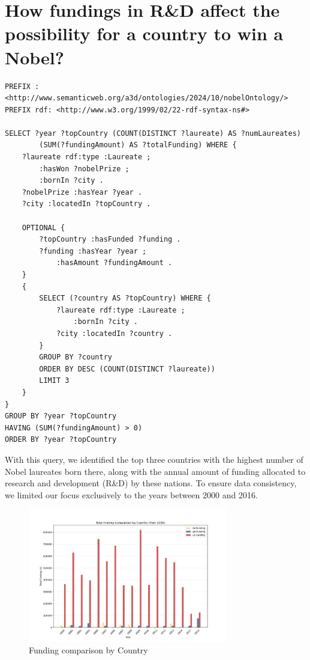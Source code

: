 \documentclass{article}
\begin{document}
\newpage

\section{How fundings in R\&D affect the possibility for a country to win a Nobel?}

\begin{lstlisting}
PREFIX : <http://www.semanticweb.org/a3d/ontologies/2024/10/nobelOntology/>
PREFIX rdf: <http://www.w3.org/1999/02/22-rdf-syntax-ns#>

SELECT ?year ?topCountry (COUNT(DISTINCT ?laureate) AS ?numLaureates)
        (SUM(?fundingAmount) AS ?totalFunding) WHERE {
    ?laureate rdf:type :Laureate ;
  	    :hasWon ?nobelPrize ;
        :bornIn ?city .
    ?nobelPrize :hasYear ?year .
    ?city :locatedIn ?topCountry .

    OPTIONAL {
        ?topCountry :hasFunded ?funding .
        ?funding :hasYear ?year ;
            :hasAmount ?fundingAmount .
    }
    {
        SELECT (?country AS ?topCountry) WHERE {
            ?laureate rdf:type :Laureate ;
                :bornIn ?city .
            ?city :locatedIn ?country .
        }
        GROUP BY ?country
        ORDER BY DESC (COUNT(DISTINCT ?laureate))
        LIMIT 3
    }
}
GROUP BY ?year ?topCountry
HAVING (SUM(?fundingAmount) > 0)
ORDER BY ?year ?topCountry
\end{lstlisting}

\vspace{1em}

With this query, we identified the top three countries with the highest number of Nobel laureates born there,
along with the annual amount of funding allocated to research and development (R\&D) by these nations.
To ensure data consistency, we limited our focus exclusively to the years between 2000 and 2016.

\begin{figure}[H]
	\centering
	\includegraphics[width=0.78\textwidth]{../queries/plots/funding_comparison_by_country.png}
	\caption{Funding comparison by Country}
	\label{fig:fundings_per_country}
\end{figure}
\end{document}
